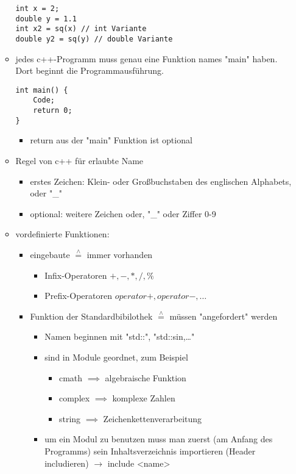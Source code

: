 \documentclass[a4paper]{scrartcl}
\newcommand{\estimates}{\overset{\scriptscriptstyle\wedge}{=}}%
\theoremstyle{definition}
\theoremstyle{plain}
\theoremstyle{remark}
\theoremstyle{remark}
\begin{document}
\begin{itemize}
\begin{itemize}
\begin{verbatim}
int x = 2;
double y = 1.1
int x2 = sq(x) // int Variante
double y2 = sq(y) // double Variante
\end{verbatim}
\item jedes c++-Programm muss genau eine Funktion names "main" haben. Dort beginnt die Programmausführung.
\begin{verbatim}
int main() {
	Code;
	return 0;
}
\end{verbatim}
\begin{itemize}
\item return aus der "main" Funktion ist optional
\end{itemize}
\item Regel von c++ für erlaubte Name
\begin{itemize}
\item erstes Zeichen: Klein- oder Großbuchstaben des englischen Alphabets, oder "\_"
\item optional: weitere Zeichen oder, "\_" oder Ziffer 0-9
\end{itemize}
\item vordefinierte Funktionen:
\begin{itemize}
\item eingebaute $\estimates$ immer vorhanden
\begin{itemize}
\item Infix-Operatoren $+,-,*,/,\%$
\item Prefix-Operatoren $operator+,operator-,\ldots$
\end{itemize}
\item Funktion der Standardbibilothek $\estimates$ müssen "angefordert" werden
\begin{itemize}
\item Namen beginnen mit "std::", "std::sin,\ldots{}"
\item sind in Module geordnet, zum Beispiel
\begin{itemize}
\item cmath $\implies$ algebraische Funktion
\item complex $\implies$ komplexe Zahlen
\item string $\implies$ Zeichenkettenverarbeitung
\end{itemize}
\item um ein Modul zu benutzen muss man zuerst (am Anfang des Programms) sein Inhaltsverzeichnis importieren (Header includieren) $\rightarrow$ include <name>
\begin{verbatim}

\end{verbatim}
\end{itemize}
\end{itemize}
\end{itemize}
\end{itemize}
\end{document}
